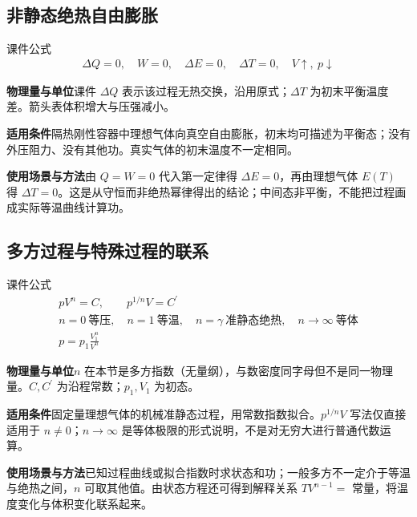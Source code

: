 \documentclass[UTF8,fontset=none,zihao=-4,a4paper]{ctexart}
\newcommand{\explain}[3]{\par\noindent\textbf{物理量与单位}\quad #1\par
\noindent\textbf{适用条件}\quad #2\par
\noindent\textbf{使用场景与方法}\quad #3\par}
\begin{document}
\par\noindent\begin{minipage}{\linewidth}
\subsection{非静态绝热自由膨胀}
\begin{infobox}[breakable=false]{课件公式}
\begin{gather*}\Delta Q=0,\quad W=0,\quad\Delta E=0,\quad\Delta T=0,\quad V\uparrow,\ p\downarrow\end{gather*}
\end{infobox}
\end{minipage}\par
\explain{课件 $\Delta Q$ 表示该过程无热交换，沿用原式；$\Delta T$ 为初末平衡温度差。箭头表体积增大与压强减小。}{隔热刚性容器中理想气体向真空自由膨胀，初末均可描述为平衡态；没有外压阻力、没有其他功。真实气体的初末温度不一定相同。}{由 $Q=W=0$ 代入第一定律得 $\Delta E=0$，再由理想气体 $E(T)$ 得 $\Delta T=0$。这是从守恒而非绝热幂律得出的结论；中间态非平衡，不能把过程画成实际等温曲线计算功。}


\par\noindent\begin{minipage}{\linewidth}
\subsection{多方过程与特殊过程的联系}
\begin{infobox}[breakable=false]{课件公式}
\begin{gather*}pV^n=C,\qquad p^{1/n}V=C^{\prime}\\n=0\ \text{等压},\quad n=1\ \text{等温},\quad n=\gamma\ \text{准静态绝热},\quad n\to\infty\ \text{等体}\\p=p_1\frac{V_1^n}{V^n}\end{gather*}
\end{infobox}
\end{minipage}\par
\explain{$n$ 在本节是多方指数（无量纲），与数密度同字母但不是同一物理量。$C,C^{\prime}$ 为沿程常数；$p_1,V_1$ 为初态。}{固定量理想气体的机械准静态过程，用常数指数拟合。$p^{1/n}V$ 写法仅直接适用于 $n\ne0$；$n\to\infty$ 是等体极限的形式说明，不是对无穷大进行普通代数运算。}{已知过程曲线或拟合指数时求状态和功；一般多方不一定介于等温与绝热之间，$n$ 可取其他值。由状态方程还可得到解释关系 $TV^{n-1}=$ 常量，将温度变化与体积变化联系起来。}
\end{document}
